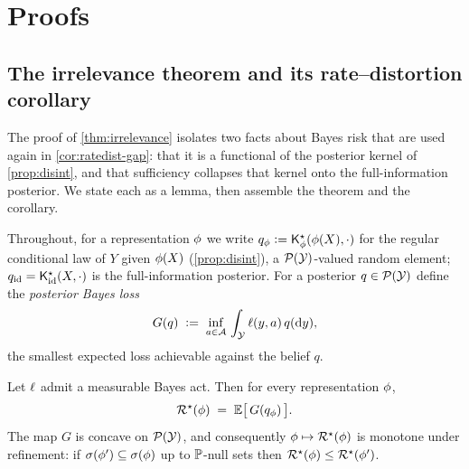 \section{Proofs}
\label{app:proofs}


\subsection{The irrelevance theorem and its rate--distortion corollary}
\label{app:irrelevance}

The proof of \cref{thm:irrelevance} isolates two facts about Bayes risk that
are used again in \cref{cor:ratedist-gap}: that it is a functional of the
posterior kernel of \cref{prop:disint}, and that sufficiency collapses that
kernel onto the full-information posterior. We state each as a lemma, then
assemble the theorem and the corollary.

Throughout, for a representation $\phi$ we write
$q_{\phi} \vcentcolon= \mathsf{K}^{\star}_{\phi}(\phi(X),\cdot)$ for the regular conditional law of
$Y$ given $\phi(X)$ (\cref{prop:disint}), a $\mathcal{P}(\mathcal{Y})$-valued random
element; $q_{\mathrm{id}} = \mathsf{K}^{\star}_{\mathrm{id}}(X,\cdot)$ is the full-information
posterior. For a posterior $q\in\mathcal{P}(\mathcal{Y})$ define the
\emph{posterior Bayes loss}
\begin{equation}
  \label{eq:bayes-loss-functional}
  G(q) \;\vcentcolon=\; \inf_{a\in\mathcal{A}}\,\int_{\mathcal{Y}}\ell(y,a)\,q(\mathrm{d}y),
\end{equation}
the smallest expected loss achievable against the belief $q$.

\begin{lemma}
\label{lem:bayes-functional}
Let $\ell$ admit a measurable Bayes act. Then for every representation $\phi$,
\begin{equation}
  \label{eq:risk-as-posterior}
  \mathcal{R}^{\star}(\phi) \;=\; \mathbb{E}\big[\,G(q_{\phi})\,\big].
\end{equation}
The map $G$ is concave on $\mathcal{P}(\mathcal{Y})$, and consequently
$\phi\mapsto\mathcal{R}^{\star}(\phi)$ is monotone under refinement: if
$\sigma\!\left(\phi'\right)\subseteq\sigma\!\left(\phi\right)$ up to $\mathbb{P}$-null sets then
$\mathcal{R}^{\star}(\phi)\le\mathcal{R}^{\star}(\phi')$.
\end{lemma}

